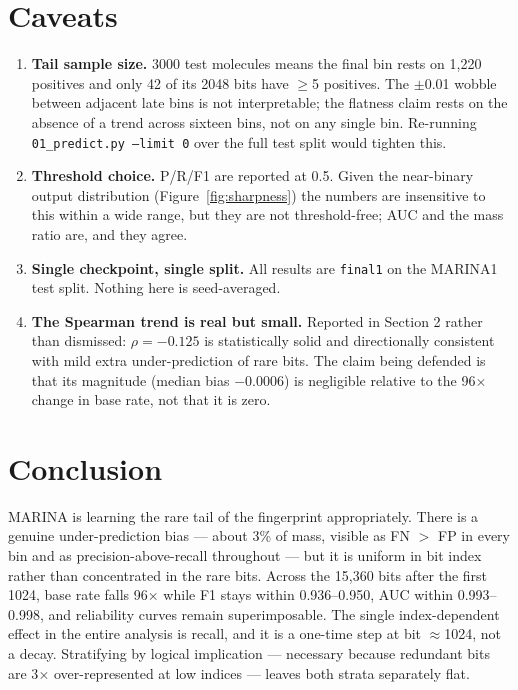 \documentclass[11pt,a4paper]{article}
\begin{document}
\section{Caveats}

\begin{enumerate}\itemsep0.2em
\item \textbf{Tail sample size.} 3000 test molecules means the final bin rests on 1{,}220 positives
and only 42 of its 2048 bits have $\geq$5 positives. The $\pm$0.01 wobble between adjacent late
bins is not interpretable; the flatness claim rests on the absence of a trend across sixteen bins,
not on any single bin. Re-running \texttt{01\_predict.py --limit 0} over the full test split would
tighten this.
\item \textbf{Threshold choice.} P/R/F1 are reported at 0.5. Given the near-binary output
distribution (Figure~\ref{fig:sharpness}) the numbers are insensitive to this within a wide range,
but they are not threshold-free; AUC and the mass ratio are, and they agree.
\item \textbf{Single checkpoint, single split.} All results are \texttt{final1} on the MARINA1 test
split. Nothing here is seed-averaged.
\item \textbf{The Spearman trend is real but small.} Reported in Section 2 rather than dismissed:
$\rho = -0.125$ is statistically solid and directionally consistent with mild extra
under-prediction of rare bits. The claim being defended is that its magnitude (median bias
$-0.0006$) is negligible relative to the 96$\times$ change in base rate, not that it is zero.
\end{enumerate}

\section{Conclusion}

MARINA is learning the rare tail of the fingerprint appropriately. There is a genuine
under-prediction bias --- about 3\% of mass, visible as FN $>$ FP in every bin and as
precision-above-recall throughout --- but it is uniform in bit index rather than concentrated in
the rare bits. Across the 15{,}360 bits after the first 1024, base rate falls 96$\times$ while F1
stays within 0.936--0.950, AUC within 0.993--0.998, and reliability curves remain superimposable.
The single index-dependent effect in the entire analysis is recall, and it is a one-time step at
bit $\approx$1024, not a decay. Stratifying by logical implication --- necessary because redundant
bits are 3$\times$ over-represented at low indices --- leaves both strata separately flat.
\end{document}
